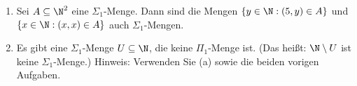 
\begin{exercise}[236]

\phantom{}
	\begin{enumerate}[label = (\alph*)]
		\item Sei $A \subseteq \N^2$ eine $\Sigma_1$-Menge. Dann sind die Mengen $\{y \in \N: (5,y) \in A\}$ und $\{x \in \N: (x,x) \in A\}$ auch $\Sigma_1$-Mengen.
		
		\item Es gibt eine $\Sigma_1$-Menge $U \subseteq \N$, die keine $\Pi_1$-Menge ist. (Das heißt: $\N \setminus U$ ist keine $\Sigma_1$-Menge.)    Hinweis: Verwenden Sie (a) sowie die beiden vorigen Aufgaben. 
	\end{enumerate}

\end{exercise}


